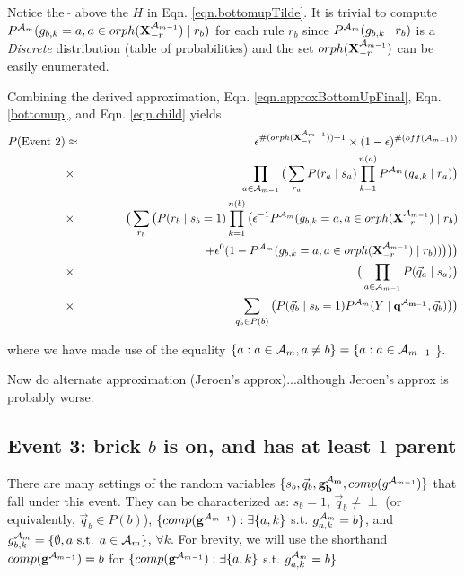 \documentclass[11pt]{article}
\newcommand{\A}{{\cal A}}
\newcommand{\X}{\mathbf{X}}
\newcommand{\XrmPrev}{\X^{\A_{m-1}}_{-r}}
\newcommand{\Am}{\A_{m}}
\newcommand{\gcompPrev}{comp(\mathbf{g}^{\A_{m-1}})}
\newcommand{\qb}{\vec{q}_b}
\newcommand{\qa}{\vec{q}_a}
\begin{document}
Notice the $~\tilde{}$ above the $H$ in Eqn. \ref{eqn.bottomupTilde}. It is trivial to compute $P^{\Am}(g_{b,k} = a, a \in orph(\XrmPrev) \mid r_b)$ for each rule $r_b$ since $P^{\Am}(g_{b,k} \mid r_b)$ is a \emph{Discrete} distribution (table of probabilities) and the set $orph(\XrmPrev)$ can be easily enumerated.

Combining the derived approximation, Eqn. \ref{eqn.approxBottomUpFinal}, Eqn. \ref{bottomup}, and Eqn. \ref{eqn.child} yields
%
\begin{eqnarray}
P(\text{Event 2}) &\approx& \epsilon^{\#(orph(\XrmPrev)) + 1} \times (1-\epsilon)^{\#(off(\A_{m-1}))}  \label{eqn.even2final} \\
%
&\times& \prod_{a \in {\A_{m-1}}} \big( \sum_{r_a} P(r_a \mid s_a) \prod_{k=1}^{n(a)} P^{\Am}(g_{a,k} \mid r_a) \big) \nonumber  \\
%
&\times&  \big( \sum_{r_b} \big( P(r_b \mid s_b = 1) \prod_{k=1}^{n(b)} \big ( \epsilon^{-1}P^{\Am}(g_{b,k} = a, a \in orph(\XrmPrev) \mid r_b) \nonumber \\ 
%
& & \qquad \qquad \qquad \qquad \qquad + \epsilon^{0}(1-P^{\Am}(g_{b,k} = a, a \in orph(\XrmPrev) \mid r_b)) \big) \big) \big) \nonumber \\
%
&\times& \big( \prod_{a \in {\A_{m-1}}} P(\qa \mid s_a) \big) \nonumber \\
&\times& \sum_{\vec{q}_b \in P(b)} \big( P(\qb \mid s_b = 1) P^{\Am}(Y \mid \mathbf{q^{\A_{m-1}}}, \vec{q}_b) \big) \big) \nonumber 
\end{eqnarray} 

where we have made use of the equality $\{ a: a \in \Am, a \neq b\} = \{a : a \in \A_{m-1}$ \}.

Now do alternate approximation (Jeroen's approx)...although Jeroen's approx is probably worse.

\subsection*{Event 3: brick $b$ is on, and has at least $1$ parent}

There are many settings of the random variables $\{s_b, \qb, \mathbf{g^{\Am}_b}, comp(g^{\A_{m-1}})\}$ that fall under this event. They can be characterized as: $s_b=1$, $\qb \neq \perp$ (or equivalently, $\qb \in P(b)$), $\{\gcompPrev : \exists \{a,k\}$ s.t. $ g^{\Am}_{a,k} = b \}$, and $g^{\Am}_{b,k} = \{\emptyset, a \text{ s.t. } a \in {\Am}\}$, $\forall k$. For brevity, we will use the shorthand $\gcompPrev = b$ for $\{\gcompPrev : \exists \{a,k\}$ s.t. $ g^{\Am}_{a,k} = b \}$
\end{document}
